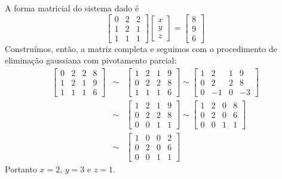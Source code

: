 \begin{resol}
A forma matricial do sistema dado é
\begin{equation*}
\left[
\begin{array}{ccc}
0 &2& 2\\
1 &2& 1\\
1 & 1 &1
\end{array}
\right]
\left[
\begin{array}{c}
x\\
y\\
z
\end{array}
\right]=
\left[
\begin{array}{c}
8\\
9\\
6
\end{array}
\right]
\end{equation*}
Construímos, então, a matriz completa e seguimos com o procedimento de eliminação gaussiana com pivotamento parcial:
\begin{eqnarray*}\left[
\begin{array}{ccc|c}
0 &2& 2&8\\
1 &2& 1&9\\
1 & 1 &1&6
\end{array}
\right] &\sim&
\left[
\begin{array}{ccc|c}
1 &2& 1&9\\
0 &2& 2&8\\
1 & 1 &1&6
\end{array}
\right]
\sim
\left[
\begin{array}{ccc|c}
1 &2& 1&9\\
0 &2& 2&8\\
0 & -1 &0&-3
\end{array}
\right]\\
&\sim&
\left[
\begin{array}{ccc|c}
1 &2& 1&9\\
0 &2& 2&8\\
0 & 0 &1&1
\end{array}
\right]
\sim
\left[
\begin{array}{ccc|c}
1 &2& 0&8\\
0 &2& 0&6\\
0 & 0 &1&1
\end{array}
\right]\\
&\sim&
\left[
\begin{array}{ccc|c}
1 &0& 0&2\\
0 &2& 0&6\\
0 & 0 &1&1
\end{array}
\right]
\end{eqnarray*}
Portanto $x=2$, $y=3$ e $z=1$.


\end{resol}
